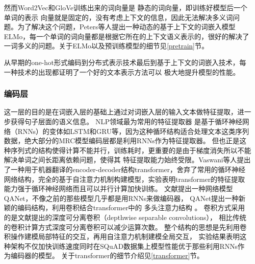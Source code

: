 然而Word2Vec和GloVe训练出来的词向量是
静态的词向量，即训练好模型后一个单词的表示
向量就是固定的，没有考虑上下文的信息，因此无法解决多义词问题。为了解决这个问题，Peters等人\cite{ELMo}提出一种动态的基于上下文的词嵌入模型ELMo，每一个单词的词向量都是根据它所在的上下文语义表示的，很好的解决了一词多义的问题。关于ELMo以及预训练模型的细节见\ref{pretrain}节。

从早期的one-hot形式编码到分布式表示技术最后到基于上下文的词嵌入技术，每一种技术的出现都证明了一个好的文本表示方法可以
极大地提升模型的性能。
\subsubsection{编码层}
这一层的目的是在词嵌入层的基础上通过对词嵌入层的输入文本做特征提取，进一步获得句子层面的语义信息。
NLP领域最为常用的特征提取器
是基于循环神经网络（RNNs）的变体如LSTM和GRU等，因为这种循环结构适合处理文本这类序列数据，绝大部分的MRC模型编码层都是利用RNNs作为特征提取器。
但也正是这种序列式的结构使得计算不能并行，训练耗时，更重要的是由于梯度消失所以不能解决单词之间长距离依赖问题，使得其
特征提取能力始终受限。Vaswani等人提出了一种用于机器翻译的encoder-decoder结构transformer，舍弃了常用的循环神经网络结构，完全的基于自注意力机制构建模型，实验表明transformer的特征提取能力强于循环神经网络而且可以并行计算加快训练。
文献\cite{QANet}提出一种网络模型QANet，不像之前的那些模型几乎都是用RNNs来做编码器，
QANet提出一种新颖的编码结构，利用卷积结合transformer中的
多头注意力结构
。
卷积方式采用的是文献\cite{DSC}提出的深度可分离卷积（depthwise 
separable convolutions），
相比传统的卷积计算方式深度可分离卷积可以减少运算次数。
整个结构的思想是先利用卷积操作建模局部特征的交互，再用自注意力机制建模全局交互，
实验结果表明这种架构不仅加快训练速度同时在SQuAD数据集上模型性能优于那些利用RNNs作为编码器的模型。
关于transformer的细节介绍见\ref{transformer}节。



